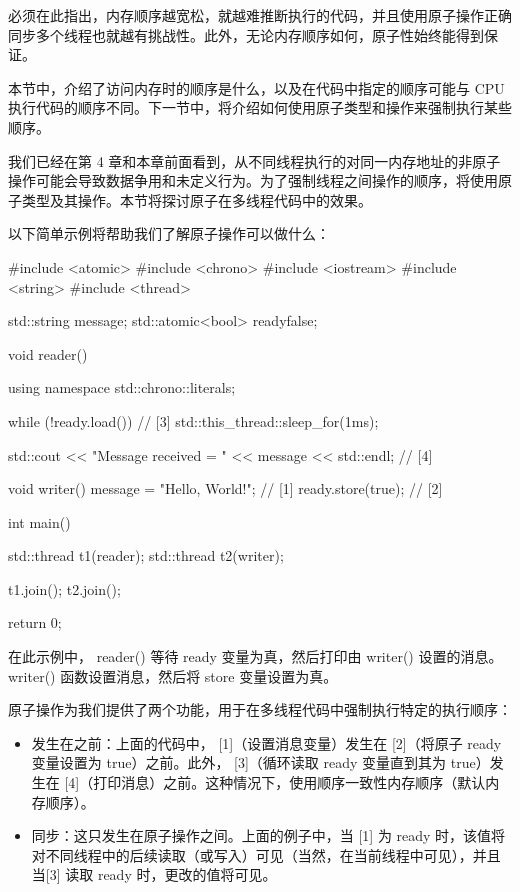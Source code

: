 必须在此指出，内存顺序越宽松，就越难推断执行的代码，并且使用原子操作正确同步多个线程也就越有挑战性。此外，无论内存顺序如何，原子性始终能得到保证。

本节中，介绍了访问内存时的顺序是什么，以及在代码中指定的顺序可能与 CPU 执行代码的顺序不同。下一节中，将介绍如何使用原子类型和操作来强制执行某些顺序。


我们已经在第 4 章和本章前面看到，从不同线程执行的对同一内存地址的非原子操作可能会导致数据争用和未定义行为。为了强制线程之间操作的顺序，将使用原子类型及其操作。本节将探讨原子在多线程代码中的效果。

以下简单示例将帮助我们了解原子操作可以做什么：

\begin{cpp}
#include <atomic>
#include <chrono>
#include <iostream>
#include <string>
#include <thread>

std::string message;
std::atomic<bool> ready{false};

void reader() {
    using namespace std::chrono::literals;

    while (!ready.load()) { // [3]
        std::this_thread::sleep_for(1ms);
    }

    std::cout << "Message received = " << message << std::endl; // [4]
}

void writer() {
    message = "Hello, World!"; // [1]
    ready.store(true); // [2]
}

int main() {
    std::thread t1(reader);
    std::thread t2(writer);

    t1.join();
    t2.join();

    return 0;
}
\end{cpp}

在此示例中， reader() 等待 ready 变量为真，然后打印由 writer() 设置的消息。 writer() 函数设置消息，然后将 store 变量设置为真。

原子操作为我们提供了两个功能，用于在多线程代码中强制执行特定的执行顺序：

\begin{itemize}
\item
发生在之前：上面的代码中， [1]（设置消息变量）发生在 [2]（将原子 ready 变量设置为 true）之前。此外， [3]（循环读取 ready 变量直到其为 true）发生在 [4]（打印消息）之前。这种情况下，使用顺序一致性内存顺序（默认内存顺序）。

\item
同步：这只发生在原子操作之间。上面的例子中，当 [1] 为 ready 时，该值将对不同线程中的后续读取（或写入）可见（当然，在当前线程中可见），并且当[3] 读取 ready 时，更改的值将可见。
\end{itemize}

